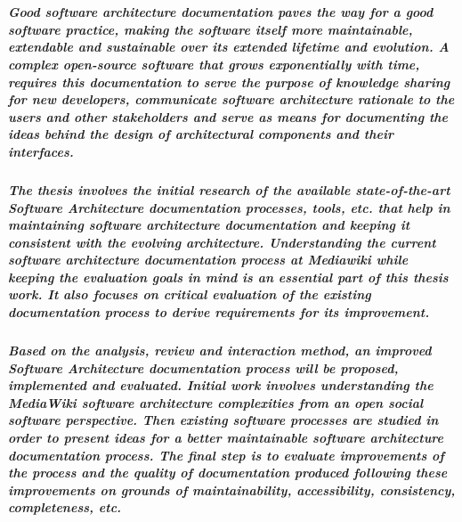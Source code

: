 \chapter{\abstractname}

\paragraph{Good software architecture documentation paves the way for a good software practice, making the software itself more maintainable, extendable and sustainable over its extended lifetime and evolution. A complex open-source software that grows exponentially with time, requires this documentation to serve the purpose of  knowledge sharing for new developers, communicate software architecture rationale to the users and other stakeholders and serve as means for documenting the ideas behind the design of architectural components and their interfaces.}
\paragraph{The thesis involves the initial research of the available state-of-the-art Software Architecture documentation processes, tools, etc. that help in maintaining software architecture documentation and keeping it consistent with the evolving architecture. Understanding the current software architecture documentation process at Mediawiki while keeping the evaluation goals in mind is an essential part of this thesis work. It also focuses on critical evaluation of the existing documentation process to derive requirements for its improvement.}
\paragraph{Based on the analysis, review and interaction method, an improved Software Architecture documentation process will be proposed, implemented and evaluated. Initial work involves understanding the MediaWiki software architecture complexities from an open social software perspective. Then existing software processes are studied in order to present ideas for a better maintainable software architecture documentation process. The final step is to evaluate improvements of the process and the quality of documentation produced following these improvements on grounds of maintainability, accessibility, consistency, completeness, etc.}
 



